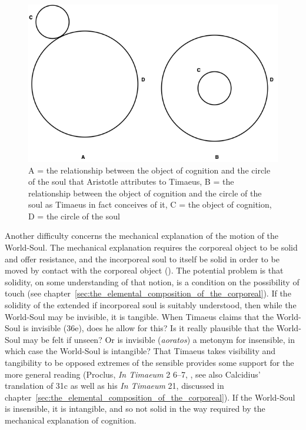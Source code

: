\begin{figure}[htbp]
	\centering
		\includegraphics[scale=0.4]{graphics/center_periphery.png}
	\caption{A = the relationship between the object of cognition and the circle of the soul that Aristotle attributes to Timaeus, B = the relationship between the object of cognition and the circle of the soul as Timaeus in fact conceives of it, C = the object of cognition, D = the circle of the soul}
	\label{fig:center_periphery}
\end{figure}

Another difficulty concerns the mechanical explanation of the motion of the World-Soul. The mechanical explanation requires the corporeal object to be solid and offer resistance, and the incorporeal soul to itself be solid in order to be moved by contact with the corporeal object (\citealt[129--33]{Betegh:2019fq}). The potential problem is that solidity, on some understanding of that notion, is a condition on the possibility of touch (see chapter~\ref{sec:the_elemental_composition_of_the_corporeal}). If the solidity of the extended if incorporeal soul is suitably understood, then while the World-Soul may be invisible, it is tangible. When Timaeus claims that the World-Soul is invisible (36e), does he allow for this? Is it really plausible that the World-Soul may be felt if unseen? Or is invisible (\emph{aoratos}) a metonym for insensible, in which case the World-Soul is intangible? That Timaeus takes visibility and tangibility to be opposed extremes of the sensible provides some support for the more general reading (Proclus, \emph{In Timaeum} 2 6--7, \citealt{Diehl:1903re}, see also Calcidius' translation of 31c as well as his \emph{In Timaeum} 21, discussed in chapter~\ref{sec:the_elemental_composition_of_the_corporeal}). If the World-Soul is insensible, it is intangible, and so not solid in the way required by the mechanical explanation of cognition. 

